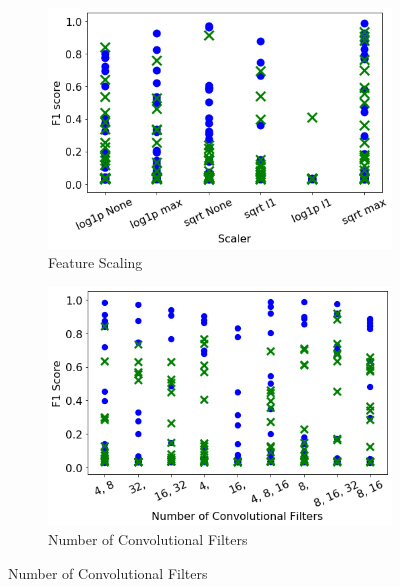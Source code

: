 \begin{figure} \ContinuedFloat
    \centering
    
    \begin{subfigure}[t]{0.49\textwidth}
        \centering
        \includegraphics[width=\textwidth]{images/cnn_scaler.png}
        \caption{Feature Scaling}
        \label{fig:cnn_scaler}
    \end{subfigure}
    \hfill
    \begin{subfigure}[t]{0.49\textwidth}
        \centering
        \includegraphics[width=\textwidth]{images/cnn_filter_structure.png}
        \caption{Number of Convolutional Filters}
        \label{fig:cnn_total_dense_layers}
    \end{subfigure}
    

\end{figure}
